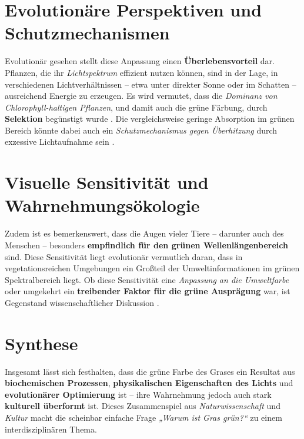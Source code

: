\section{Evolutionäre Perspektiven und Schutzmechanismen}
Evolutionär gesehen stellt diese Anpassung einen \textbf{Überlebensvorteil} dar. Pflanzen, die ihr \textit{Lichtspektrum} effizient nutzen können, sind in der Lage, in verschiedenen Lichtverhältnissen – etwa unter direkter Sonne oder im Schatten – ausreichend Energie zu erzeugen. Es wird vermutet, dass die \textit{Dominanz von Chlorophyll-haltigen Pflanzen}, und damit auch die grüne Färbung, durch \textbf{Selektion} begünstigt wurde \parencite{schmidt2015chlorophyll}. Die vergleichsweise geringe Absorption im grünen Bereich könnte dabei auch ein \emph{Schutzmechanismus gegen Überhitzung} durch exzessive Lichtaufnahme sein \parencite{gao2010lightabsorption}.

\section{Visuelle Sensitivität und Wahrnehmungsökologie}
Zudem ist es bemerkenswert, dass die Augen vieler Tiere – darunter auch des Menschen – besonders \textbf{empfindlich für den grünen Wellenlängenbereich} sind. Diese Sensitivität liegt evolutionär vermutlich daran, dass in vegetationsreichen Umgebungen ein Großteil der Umweltinformationen im grünen Spektralbereich liegt. Ob diese Sensitivität eine \textit{Anpassung an die Umweltfarbe} oder umgekehrt ein \textbf{treibender Faktor für die grüne Ausprägung} war, ist Gegenstand wissenschaftlicher Diskussion \parencite{renoult2017evolution}.

\section{Synthese}
Insgesamt lässt sich festhalten, dass die grüne Farbe des Grases ein Resultat aus \textbf{biochemischen Prozessen}, \textbf{physikalischen Eigenschaften des Lichts} und \textbf{evolutionärer Optimierung} ist – ihre Wahrnehmung jedoch auch stark \textbf{kulturell überformt} ist. Dieses Zusammenspiel aus \emph{Naturwissenschaft} und \emph{Kultur} macht die scheinbar einfache Frage \emph{„Warum ist Gras grün?“} zu einem interdisziplinären Thema.
